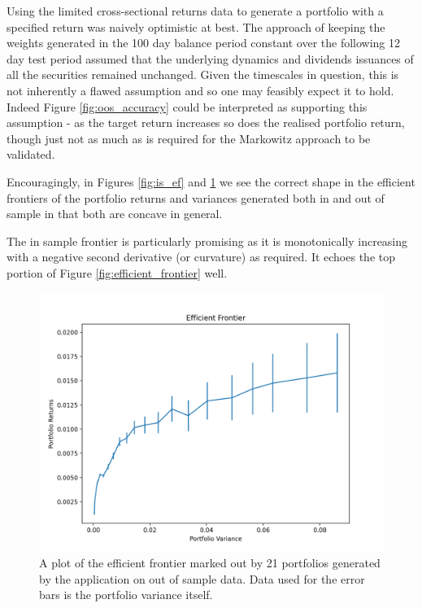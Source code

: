 \documentclass{article}
\begin{document}
Using the limited cross-sectional returns data to generate a portfolio with a specified return was naively optimistic at best. The approach of keeping the weights generated in the 100 day balance period constant over the following 12 day test period assumed that the underlying dynamics and dividends issuances of all the securities remained unchanged. Given the timescales in question, this is not inherently a flawed assumption and so one may feasibly expect it to hold. Indeed  Figure \ref{fig:oos_accuracy} could be interpreted as supporting this assumption - as the target return increases so does the realised portfolio return, though just not as much as is required for the Markowitz approach to be validated.



Encouragingly, in Figures \ref{fig:is_ef} and \ref{fig:oos_ef} we see the correct shape in the efficient frontiers of the portfolio returns and variances generated both in and out of sample in that both are concave in general.

The in sample frontier is particularly promising as it is monotonically increasing with a negative second derivative (or curvature) as required. It echoes the top portion of Figure \ref{fig:efficient_frontier} well.



\begin{figure}[H]
	\centerline{\includegraphics[width=\textwidth]{figures/oos_ef.png}}
	\caption{A plot of the efficient frontier marked out by 21 portfolios generated by the application on out of sample data. Data used for the error bars is the portfolio variance itself.}
		\label{fig:oos_ef}
\end{figure}
\end{document}
